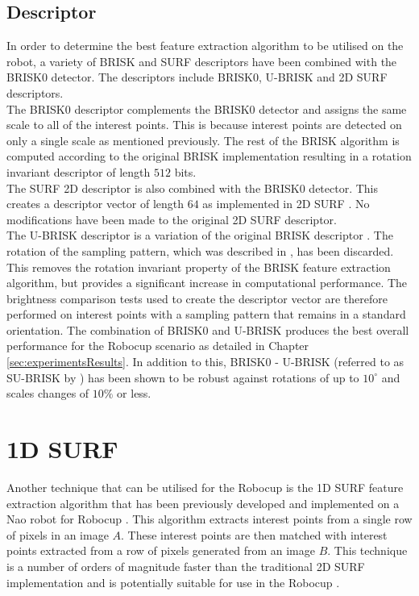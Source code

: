 \subsection{Descriptor}
\label{sec:BRISK0Describe}
In order to determine the best feature extraction algorithm to be utilised on the robot, a variety of BRISK and SURF descriptors have been combined with the BRISK0 detector. The descriptors include BRISK0, U-BRISK and 2D SURF descriptors.\\

The BRISK0 descriptor complements the BRISK0 detector and assigns the same scale to all of the interest points. This is because interest points are detected on only a single scale as mentioned previously. The rest of the BRISK algorithm is computed according to the original BRISK implementation resulting in a rotation invariant descriptor of length $512$ bits\citep{Leutenegger2011}.\\

The SURF 2D descriptor is also combined with the BRISK0 detector. This creates a descriptor vector of length $64$ as implemented in 2D SURF \citep{Bay2008}. No modifications have been made to the original 2D SURF descriptor.\\ 

The U-BRISK descriptor is a variation of the original BRISK descriptor \citep{Leutenegger2011}. The rotation of the sampling pattern, which was described in , has been discarded. This removes the rotation invariant property of the BRISK feature extraction algorithm, but provides a significant increase in computational performance. The brightness comparison tests used to create the descriptor vector are therefore performed on interest points with a sampling pattern that remains in a standard orientation. The combination of BRISK0 and U-BRISK produces the best overall performance for the Robocup scenario as detailed in Chapter \ref{sec:experimentsResults}. In addition to this, BRISK0 - U-BRISK (referred to as SU-BRISK by \citet{Leutenegger2011}) has been shown to be robust against rotations of up to $10^{\circ}$ and scales changes of $10\%$ or less.\\

\section{1D SURF}
\label{sec:1dsurf}
Another technique that can be utilised for the Robocup is the 1D SURF feature extraction algorithm that has been previously developed and implemented on a Nao robot for Robocup \citep{Anderson}. This algorithm extracts interest points from a single row of pixels in an image $A$. These interest points are then matched with interest points extracted from a row of pixels generated from an image $B$. This technique is a number of orders of magnitude faster than the traditional 2D SURF implementation and is potentially suitable for use in the Robocup \citep{Anderson}.\\

